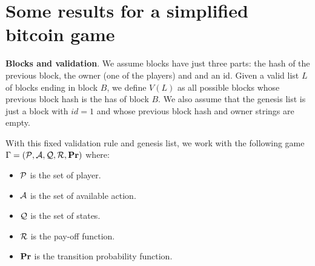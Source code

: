 %
%
%
%

\section{Some results for a simplified bitcoin game}

\medskip
\noindent
\textbf{Blocks and validation}. We assume blocks have just three parts: the hash of the previous block, the owner (one of the players) and 
and an id. Given a valid list $L$ of blocks ending in block $B$, we define $V(L)$ as all possible blocks whose previous block hash is 
the has of block $B$. We also assume that the genesis list is just a block with $id = 1$ and 
whose previous block hash and owner strings are empty. 

With this fixed validation rule and genesis list, we work with the following game $\Gamma = (\mathcal{P},\mathcal{A},\mathcal{Q},\mathcal{R},\mathbf{Pr})$ where:
\begin{itemize}
	\item $\mathcal{P}$ is the set of player.
	\item $\mathcal{A}$ is the set of available action.
	\item $\mathcal{Q}$ is the set of states.
	\item $\mathcal{R}$ is the pay-off function.
	\item $\mathbf{Pr}$ is the transition probability function.
\end{itemize} 


